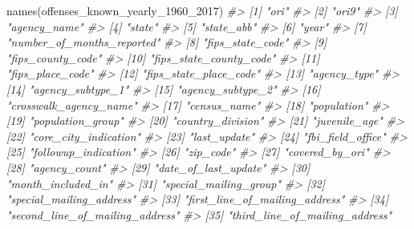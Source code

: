 \documentclass[
  12pt,
  openany]{book}
\newenvironment{Shaded}{\begin{snugshade}}{\end{snugshade}}
\newcommand{\CommentTok}[1]{\textcolor[rgb]{0.37,0.37,0.37}{\textit{#1}}}
\newcommand{\FunctionTok}[1]{\textcolor[rgb]{0,0,0}{#1}}
\newcommand{\NormalTok}[1]{#1}
\begin{document}
\begin{Shaded}
\begin{Highlighting}[]
\FunctionTok{names}\NormalTok{(offenses\_known\_yearly\_1960\_2017)}
\CommentTok{\#\textgreater{}   [1] "ori"                           }
\CommentTok{\#\textgreater{}   [2] "ori9"                          }
\CommentTok{\#\textgreater{}   [3] "agency\_name"                   }
\CommentTok{\#\textgreater{}   [4] "state"                         }
\CommentTok{\#\textgreater{}   [5] "state\_abb"                     }
\CommentTok{\#\textgreater{}   [6] "year"                          }
\CommentTok{\#\textgreater{}   [7] "number\_of\_months\_reported"     }
\CommentTok{\#\textgreater{}   [8] "fips\_state\_code"               }
\CommentTok{\#\textgreater{}   [9] "fips\_county\_code"              }
\CommentTok{\#\textgreater{}  [10] "fips\_state\_county\_code"        }
\CommentTok{\#\textgreater{}  [11] "fips\_place\_code"               }
\CommentTok{\#\textgreater{}  [12] "fips\_state\_place\_code"         }
\CommentTok{\#\textgreater{}  [13] "agency\_type"                   }
\CommentTok{\#\textgreater{}  [14] "agency\_subtype\_1"              }
\CommentTok{\#\textgreater{}  [15] "agency\_subtype\_2"              }
\CommentTok{\#\textgreater{}  [16] "crosswalk\_agency\_name"         }
\CommentTok{\#\textgreater{}  [17] "census\_name"                   }
\CommentTok{\#\textgreater{}  [18] "population"                    }
\CommentTok{\#\textgreater{}  [19] "population\_group"              }
\CommentTok{\#\textgreater{}  [20] "country\_division"              }
\CommentTok{\#\textgreater{}  [21] "juvenile\_age"                  }
\CommentTok{\#\textgreater{}  [22] "core\_city\_indication"          }
\CommentTok{\#\textgreater{}  [23] "last\_update"                   }
\CommentTok{\#\textgreater{}  [24] "fbi\_field\_office"              }
\CommentTok{\#\textgreater{}  [25] "followup\_indication"           }
\CommentTok{\#\textgreater{}  [26] "zip\_code"                      }
\CommentTok{\#\textgreater{}  [27] "covered\_by\_ori"                }
\CommentTok{\#\textgreater{}  [28] "agency\_count"                  }
\CommentTok{\#\textgreater{}  [29] "date\_of\_last\_update"           }
\CommentTok{\#\textgreater{}  [30] "month\_included\_in"             }
\CommentTok{\#\textgreater{}  [31] "special\_mailing\_group"         }
\CommentTok{\#\textgreater{}  [32] "special\_mailing\_address"       }
\CommentTok{\#\textgreater{}  [33] "first\_line\_of\_mailing\_address" }
\CommentTok{\#\textgreater{}  [34] "second\_line\_of\_mailing\_address"}
\CommentTok{\#\textgreater{}  [35] "third\_line\_of\_mailing\_address" }

\end{Highlighting}
\end{Shaded}
\end{document}

